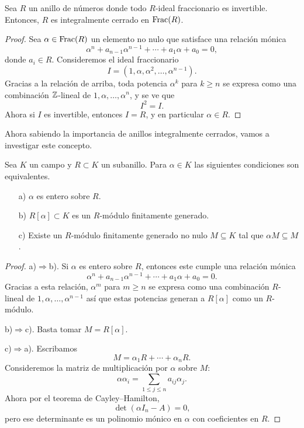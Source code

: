 \begin{proposicion}
  Sea $R$ un anillo de números donde todo $R$-ideal fraccionario es invertible.
  Entonces, $R$ es integralmente cerrado en $\operatorname{Frac} (R)$.

  \begin{proof}
    Sea $\alpha \in \operatorname{Frac} (R)$ un elemento no nulo que satisface una relación
    mónica
    $$\alpha^n + a_{n-1} \alpha^{n-1} + \cdots + a_1 \alpha + a_0 = 0,$$
    donde $a_i \in R$. Consideremos el ideal fraccionario
    $$I = (1,\alpha,\alpha^2,\ldots,\alpha^{n-1}).$$
    Gracias a la relación de arriba, toda potencia $\alpha^k$ para $k \ge n$
    se expresa como una combinación $\mathbb{Z}$-lineal de $1,\alpha,\ldots,\alpha^n$,
    y se ve que
    $$I^2 = I.$$
    Ahora si $I$ es invertible, entonces $I = R$, y en particular
    $\alpha \in R$.
  \end{proof}
\end{proposicion}

Ahora sabiendo la importancia de anillos integralmente cerrados, vamos
a investigar este concepto.

\begin{lema}
  \label{lema:caracterizacion-de-integralidad}
  Sea $K$ un campo y $R \subset K$ un subanillo.
  Para $\alpha \in K$ las siguientes condiciones son equivalentes.

  \begin{enumerate}
  \item[a)] $\alpha$ es entero sobre $R$.

  \item[b)] $R [\alpha] \subset K$ es un $R$-módulo finitamente generado.

  \item[c)] Existe un $R$-módulo finitamente generado no nulo
    $M \subseteq K$ tal que $\alpha M \subseteq M$.
  \end{enumerate}

  \begin{proof}
    \noindent a)$\Rightarrow$b).
    Si $\alpha$ es entero sobre $R$, entonces este cumple una relación mónica
    $$\alpha^n + a_{n-1} \alpha^{n-1} + \cdots + a_1 \alpha + a_0 = 0.$$
    Gracias a esta relación, $\alpha^m$ para $m \ge n$ se expresa como
    una combinación $R$-lineal de $1, \alpha, \ldots, \alpha^{n-1}$ así que
    estas potencias generan a $R [\alpha]$ como un $R$-módulo.

    \noindent b)$\Rightarrow$c).
    Basta tomar $M = R [\alpha]$.

    \noindent c)$\Rightarrow$a).
    Escribamos
    $$M = \alpha_1 R + \cdots + \alpha_n R.$$
    Consideremos la matriz de multiplicación por $\alpha$ sobre $M$:
    $$\alpha \alpha_i = \sum_{1 \le j \le n} a_{ij} \alpha_j.$$
    Ahora por el teorema de Cayley--Hamilton,
    $$\det (\alpha I_n - A) = 0,$$
    pero ese determinante es un polinomio mónico en $\alpha$ con coeficientes en
    $R$.
  \end{proof}
\end{lema}

